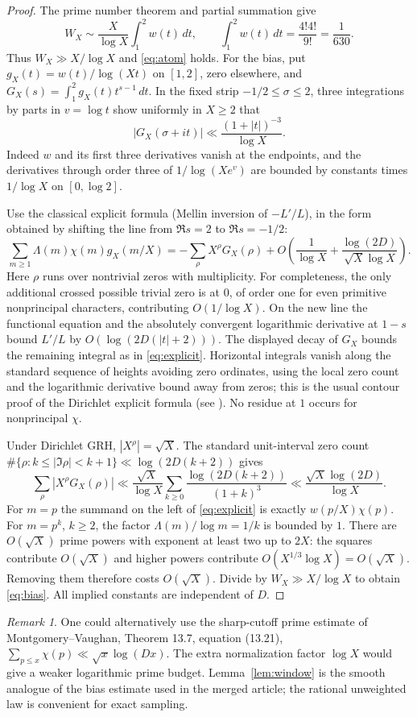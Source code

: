 \documentclass[11pt]{article}
\theoremstyle{remark}\newtheorem{remark}[theorem]{Remark}
\begin{document}
\begin{proof}
The prime number theorem and partial summation give
\[
 W_X\sim \frac{X}{\log X}\int_1^2w(t)\,dt,
 \qquad \int_1^2 w(t)\,dt=\frac{4!4!}{9!}=\frac1{630}.
\]
Thus $W_X\gg X/\log X$ and \eqref{eq:atom} holds. For the bias, put $g_X(t)=w(t)/\log(Xt)$ on $[1,2]$, zero elsewhere, and $G_X(s)=\int_1^2g_X(t)t^{s-1}\,dt$. In the fixed strip $-1/2\le\sigma\le2$, three integrations by parts in $v=\log t$ show uniformly in $X\ge2$ that
\[
 |G_X(\sigma+it)|\ll \frac{(1+|t|)^{-3}}{\log X}.
\]
Indeed $w$ and its first three derivatives vanish at the endpoints, and the derivatives through order three of $1/\log(Xe^v)$ are bounded by constants times $1/\log X$ on $[0,\log2]$.

Use the classical explicit formula (Mellin inversion of $-L'/L$), in the form obtained by shifting the line from $\Re s=2$ to $\Re s=-1/2$:
\begin{equation}\label{eq:explicit}
 \sum_{m\ge1}\Lambda(m)\chi(m)g_X(m/X)
 =-\sum_{\rho}X^\rho G_X(\rho)+O\left(\frac1{\log X}+\frac{\log(2D)}{\sqrt X\log X}\right).
\end{equation}
Here $\rho$ runs over nontrivial zeros with multiplicity. For completeness, the only additional crossed possible trivial zero is at $0$, of order one for even primitive nonprincipal characters, contributing $O(1/\log X)$. On the new line the functional equation and the absolutely convergent logarithmic derivative at $1-s$ bound $L'/L$ by $O(\log(2D(|t|+2)))$. The displayed decay of $G_X$ bounds the remaining integral as in \eqref{eq:explicit}. Horizontal integrals vanish along the standard sequence of heights avoiding zero ordinates, using the local zero count and the logarithmic derivative bound away from zeros; this is the usual contour proof of the Dirichlet explicit formula (see \cite[Chs.~10,13]{mv}). No residue at $1$ occurs for nonprincipal $\chi$.

Under Dirichlet GRH, $|X^\rho|=\sqrt X$. The standard unit-interval zero count $\#\{\rho:k\le |\Im\rho|<k+1\}\ll\log(2D(k+2))$ gives
\[
 \sum_{\rho}|X^\rho G_X(\rho)|
 \ll \frac{\sqrt X}{\log X}\sum_{k\ge0}\frac{\log(2D(k+2))}{(1+k)^3}
 \ll \frac{\sqrt X\log(2D)}{\log X}.
\]
For $m=p$ the summand on the left of \eqref{eq:explicit} is exactly $w(p/X)\chi(p)$. For $m=p^k$, $k\ge2$, the factor $\Lambda(m)/\log m=1/k$ is bounded by $1$. There are $O(\sqrt X)$ prime powers with exponent at least two up to $2X$: the squares contribute $O(\sqrt X)$ and higher powers contribute $O(X^{1/3}\log X)=O(\sqrt X)$. Removing them therefore costs $O(\sqrt X)$. Divide by $W_X\gg X/\log X$ to obtain \eqref{eq:bias}. All implied constants are independent of $D$.
\end{proof}
\begin{remark}
One could alternatively use the sharp-cutoff prime estimate of Montgomery--Vaughan, Theorem 13.7, equation (13.21), $\sum_{p\le x}\chi(p)\ll\sqrt x\log(Dx)$. The extra normalization factor $\log X$ would give a weaker logarithmic prime budget. Lemma~\ref{lem:window} is the smooth analogue of the bias estimate used in the merged article; the rational unweighted law is convenient for exact sampling.
\end{remark}
\end{document}
